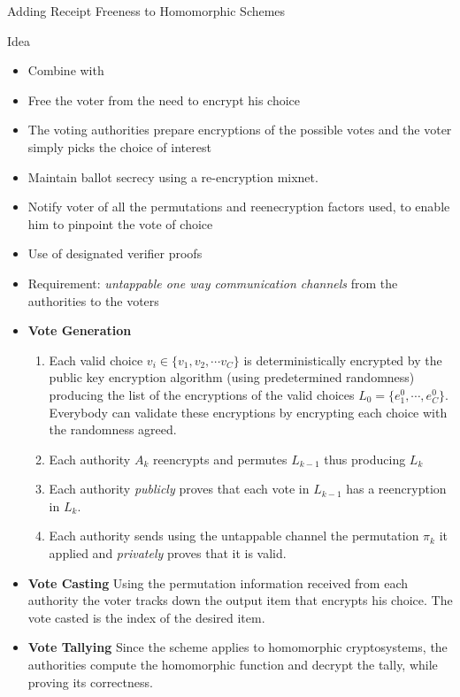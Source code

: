 \documentclass{beamer}
\begin{document}
\begin{frame}[allowframebreaks]{Adding Receipt Freeness to Homomorphic Schemes \cite{HS00}}

\begin{block}{Idea}
\begin{itemize}
\item Combine \cite{SK95} with \cite{CGS97}
\item Free the voter from the need to encrypt his choice
\item The voting authorities prepare encryptions of the possible votes and the voter simply picks the choice of interest
\item Maintain ballot secrecy using a re-encryption mixnet.
\item Notify voter of all the permutations and reenecryption factors used, to enable him to pinpoint   the vote of choice
\item Use of designated verifier proofs
\item Requirement: \textit{untappable one way communication channels} from the authorities to the voters
\end{itemize}
\end{block}

\framebreak 

\begin{itemize} 
\item \textbf{Vote Generation}
\begin{enumerate}
\item Each valid choice $v_i \in \{ v_1, v_2, \cdots v_C \}$ is deterministically encrypted by the public key encryption algorithm (using predetermined randomness) producing the list of the encryptions of the valid choices $L_0=\{e_1^0, \cdots, e_C^0\}$. Everybody can validate these encryptions by encrypting each choice with the randomness agreed.
\item Each authority $A_k$ reencrypts and permutes $L_{k-1}$ thus producing $L_k$
\item Each authority \textit{publicly} proves that each vote in $L_{k-1}$ has a reencryption in $L_k$.
\item Each authority sends using the untappable channel the permutation $\pi_k$ it applied and \textit{privately} proves that it is valid.
\end{enumerate}
\item \textbf{Vote Casting} Using the permutation information received from each authority the voter tracks down the output item that encrypts his choice.
The vote casted is the index of the desired item.
\item \textbf{Vote Tallying} Since the scheme applies to homomorphic cryptosystems, the authorities compute the homomorphic function and decrypt the tally, while proving its correctness. 
\end{itemize}


\end{frame}
\end{document}
